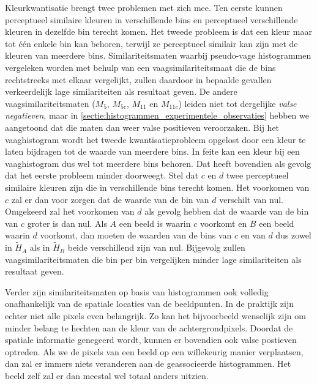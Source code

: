 Kleurkwantisatie brengt twee problemen met zich mee. Ten eerste kunnen 
perceptueel similaire kleuren in verschillende bins en perceptueel 
verschillende kleuren in dezelfde bin terecht komen. Het tweede probleem is dat 
een kleur maar tot \'e\'en enkele bin kan behoren, terwijl ze perceptueel 
similair kan zijn met de kleuren van meerdere bins. Similariteitsmaten waarbij 
pseudo-vage histogrammen vergeleken worden met behulp van een 
vaagsimilariteitsmaat die de bins rechtstreeks met elkaar vergelijkt, zullen 
daardoor in bepaalde gevallen verkeerdelijk lage similariteiten als resultaat 
geven. De andere vaagsimilariteitsmaten ($M_5$, $M_{5c}$, $M_{11}$ en 
$M_{11c}$) leiden niet tot dergelijke \emph{valse negatieven}, maar in 
\ref{sectie:histogrammen_experimentele_observaties} hebben we aangetoond dat 
die maten dan weer valse positieven veroorzaken.
Bij het vaaghistogram wordt het tweede kwantisatieprobleem opgelost
door een kleur te laten bijdragen tot de waarde van meerdere bins. In feite kan een kleur
bij een vaaghistogram dus wel tot meerdere bins behoren. Dat heeft
bovendien als gevolg dat het eerste probleem minder doorweegt. Stel dat $c$ en $d$ twee perceptueel
similaire kleuren zijn die in verschillende bins terecht komen. Het
voorkomen van $c$ zal er dan voor zorgen dat de waarde van de bin van $d$ verschilt van nul.
Omgekeerd zal het voorkomen van $d$ als gevolg hebben dat de waarde van de bin van $c$ groter is
dan nul. Als $A$ een beeld is waarin $c$ voorkomt en $B$ een beeld waarin $d$ voorkomt, dan
moeten de waarden van de bins van $c$ en van $d$ dus zowel in $\widetilde{H}_A$ als in 
$\widetilde{H}_B$ beide verschillend zijn van nul. Bijgevolg zullen vaagsimilariteitsmaten
die bin per bin vergelijken minder lage similariteiten als resultaat geven.

Verder zijn similariteitsmaten op basis van histogrammen ook volledig onafhankelijk van de 
spatiale locaties van de beeldpunten. In
de praktijk zijn echter niet alle pixels even belangrijk. Zo kan het
bijvoorbeeld wenselijk zijn om minder belang te hechten aan de kleur van
de achtergrondpixels. Doordat de spatiale informatie genegeerd wordt,
kunnen er bovendien ook valse postieven optreden. Als we de pixels van een
beeld op een willekeurig manier verplaatsen, dan zal er immers niets veranderen aan
de geassocieerde histogrammen. Het beeld zelf zal er dan meestal wel totaal anders uitzien.  

